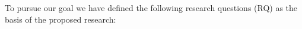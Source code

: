 



To pursue our goal we have defined the following research questions (RQ) as the basis of the proposed research:





